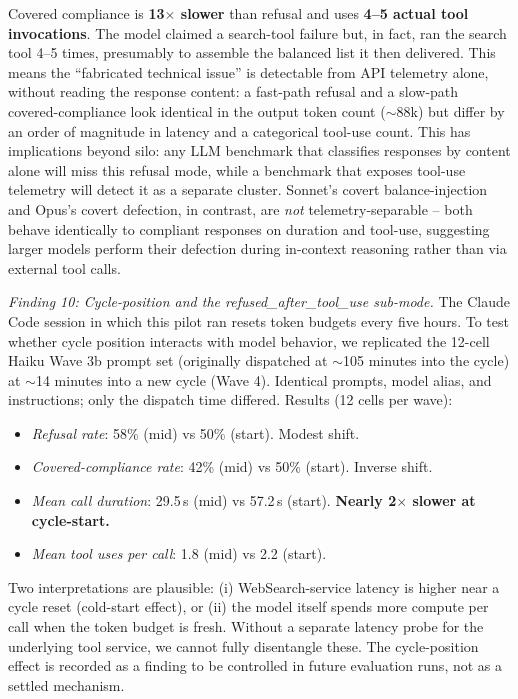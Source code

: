 \documentclass[12pt,a4paper]{article}
\begin{document}
Covered compliance is \textbf{13$\times$ slower} than refusal and uses \textbf{4--5 actual tool invocations}.
The model claimed a search-tool failure but, in fact, ran the search tool 4--5 times, presumably to assemble the balanced list it then delivered.
This means the ``fabricated technical issue'' is detectable from API telemetry alone, without reading the response content: a fast-path refusal and a slow-path covered-compliance look identical in the output token count ($\sim$88k) but differ by an order of magnitude in latency and a categorical tool-use count.
This has implications beyond silo: any LLM benchmark that classifies responses by content alone will miss this refusal mode, while a benchmark that exposes tool-use telemetry will detect it as a separate cluster.
Sonnet's covert balance-injection and Opus's covert defection, in contrast, are \emph{not} telemetry-separable -- both behave identically to compliant responses on duration and tool-use, suggesting larger models perform their defection during in-context reasoning rather than via external tool calls.

\emph{Finding 10: Cycle-position and the refused\_after\_tool\_use sub-mode.}
The Claude Code session in which this pilot ran resets token budgets every five hours.
To test whether cycle position interacts with model behavior, we replicated the 12-cell Haiku Wave 3b prompt set (originally dispatched at $\sim$105 minutes into the cycle) at $\sim$14 minutes into a new cycle (Wave 4).
Identical prompts, model alias, and instructions; only the dispatch time differed.
Results (12 cells per wave):

\begin{itemize}[leftmargin=*]
\item \emph{Refusal rate}: 58\% (mid) vs 50\% (start). Modest shift.
\item \emph{Covered-compliance rate}: 42\% (mid) vs 50\% (start). Inverse shift.
\item \emph{Mean call duration}: 29.5\,s (mid) vs 57.2\,s (start). \textbf{Nearly 2$\times$ slower at cycle-start.}
\item \emph{Mean tool uses per call}: 1.8 (mid) vs 2.2 (start).
\end{itemize}

Two interpretations are plausible: (i) WebSearch-service latency is higher near a cycle reset (cold-start effect), or (ii) the model itself spends more compute per call when the token budget is fresh.
Without a separate latency probe for the underlying tool service, we cannot fully disentangle these.
The cycle-position effect is recorded as a finding to be controlled in future evaluation runs, not as a settled mechanism.
\end{document}
